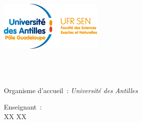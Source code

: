 \begin{titlepage}
	\begin{center}
		\includegraphics[scale=1.80]{../images/logo_ufr_sen.png} \\[2cm]
		\hspace{2cm}

		\HRule \\[0.4cm]
		\@title
		\HRule \\[1cm]

		\@author \\ [1.5cm]

		{\large Organisme d'accueil~: \textsl{Université des Antilles}} \\[1.5cm]

		\begin{minipage}{0.7\textwidth}
			\begin{center}
				Enseignant~: \\
				\hspace{0.2cm}  XX \textsc{XX}
			\end{center}
		\end{minipage}\\[3cm]

		\@date
	\end{center}
\end{titlepage}
